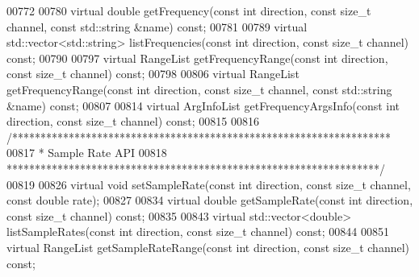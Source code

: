 \begin{DoxyCode}
00772 
00780     \textcolor{keyword}{virtual} \textcolor{keywordtype}{double} getFrequency(\textcolor{keyword}{const} \textcolor{keywordtype}{int} direction, \textcolor{keyword}{const} \textcolor{keywordtype}{size\_t} channel, \textcolor{keyword}{const} 
      std::string &name) \textcolor{keyword}{const};
00781 
00789     \textcolor{keyword}{virtual} std::vector<std::string> listFrequencies(\textcolor{keyword}{const} \textcolor{keywordtype}{int} direction, \textcolor{keyword}{const} \textcolor{keywordtype}{size\_t} channel) \textcolor{keyword}{const};
00790 
00797     \textcolor{keyword}{virtual} RangeList getFrequencyRange(\textcolor{keyword}{const} \textcolor{keywordtype}{int} direction, \textcolor{keyword}{const} \textcolor{keywordtype}{size\_t} channel) \textcolor{keyword}{const};
00798 
00806     \textcolor{keyword}{virtual} RangeList getFrequencyRange(\textcolor{keyword}{const} \textcolor{keywordtype}{int} direction, \textcolor{keyword}{const} \textcolor{keywordtype}{size\_t} channel, \textcolor{keyword}{const} 
      std::string &name) \textcolor{keyword}{const};
00807 
00814     \textcolor{keyword}{virtual} ArgInfoList getFrequencyArgsInfo(\textcolor{keyword}{const} \textcolor{keywordtype}{int} direction, \textcolor{keyword}{const} \textcolor{keywordtype}{size\_t} channel) \textcolor{keyword}{const};
00815 
00816     \textcolor{comment}{/*******************************************************************}
00817 \textcolor{comment}{     * Sample Rate API}
00818 \textcolor{comment}{     ******************************************************************/}
00819 
00826     \textcolor{keyword}{virtual} \textcolor{keywordtype}{void} setSampleRate(\textcolor{keyword}{const} \textcolor{keywordtype}{int} direction, \textcolor{keyword}{const} \textcolor{keywordtype}{size\_t} channel, \textcolor{keyword}{const} \textcolor{keywordtype}{double} 
      rate);
00827 
00834     \textcolor{keyword}{virtual} \textcolor{keywordtype}{double} getSampleRate(\textcolor{keyword}{const} \textcolor{keywordtype}{int} direction, \textcolor{keyword}{const} \textcolor{keywordtype}{size\_t} channel) \textcolor{keyword}{const};
00835 
00843     \textcolor{keyword}{virtual} std::vector<double> listSampleRates(\textcolor{keyword}{const} \textcolor{keywordtype}{int} direction, \textcolor{keyword}{const} \textcolor{keywordtype}{size\_t} channel) \textcolor{keyword}{const};
00844 
00851     \textcolor{keyword}{virtual} RangeList getSampleRateRange(\textcolor{keyword}{const} \textcolor{keywordtype}{int} direction, \textcolor{keyword}{const} \textcolor{keywordtype}{size\_t} channel) \textcolor{keyword}{const};

\end{DoxyCode}

